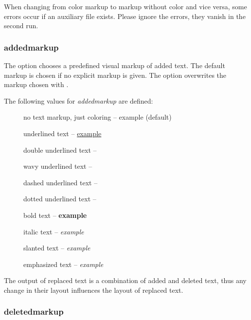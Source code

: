 
When changing from color markup to markup without color and vice versa, some errors occur if an auxiliary file exists.
Please ignore the errors, they vanish in the second run.

\subsubsection{addedmarkup}


The  option chooses a predefined visual markup of added text.
The default markup is chosen if no explicit markup is given.
The option  overwrites the markup chosen with .

The following values for \emph{addedmarkup} are defined:

\begin{description}
	\item [] no text markup, just coloring -- {\color{orange} example} (default)
	\item [] underlined text -- \uline{example}
	\item [] double underlined text -- 
	\item [] wavy underlined text -- 
	\item [] dashed underlined text -- 
	\item [] dotted underlined text -- 
	\item [] bold text -- \textbf{example}
	\item [] italic text -- \textit{example}
	\item [] slanted text -- \textsl{example}
	\item [] emphasized text -- \emph{example}
\end{description}

The output of replaced text is a combination of added and deleted text, thus any change in their layout influences the layout of replaced text.



\subsubsection{deletedmarkup}
\label{sec:ui:options:deletedmarkup}

